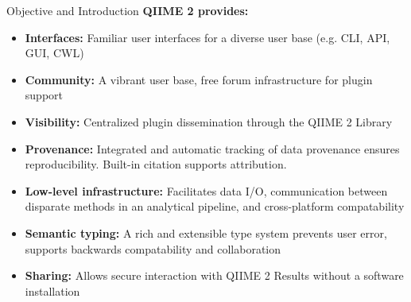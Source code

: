 \documentclass[final]{beamer}
\newlength{\colwidth}
\begin{document}
\begin{frame}[t]
\begin{columns}[t]
\begin{column}{\colwidth}
\begin{block}{Objective and Introduction}
    \textbf{QIIME 2 provides:}
    \begin{itemize}
      \item \textbf{Interfaces:} Familiar user interfaces for a diverse
      user base (e.g. CLI, API, GUI, CWL)
      \item \textbf{Community:} A vibrant user base, free forum infrastructure for
      plugin support
      \item \textbf{Visibility:} Centralized plugin dissemination through the QIIME 2
      Library
      \item \textbf{Provenance:} Integrated and automatic tracking of data provenance
      ensures reproducibility. Built-in citation supports attribution.
      \item \textbf{Low-level infrastructure:} Facilitates data I/O, communication
      between disparate methods in an analytical pipeline, and cross-platform compatability
      \item \textbf{Semantic typing:} A rich and extensible type system prevents user
      error, supports backwards compatability and collaboration
      \item \textbf{Sharing:} Allows secure interaction with QIIME 2 Results
       without a software installation
    \end{itemize}
  \end{block}



\end{column}
\end{columns}
\end{frame}
\end{document}
